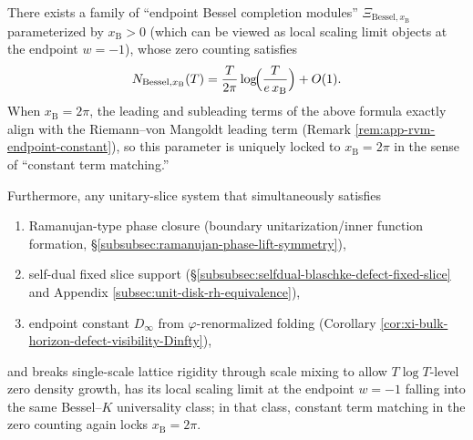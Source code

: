 \begin{conjecture}[Universality conjecture for the endpoint Bessel completion: locking \texorpdfstring{$x_{\mathrm{B}}=2\pi$}{xB=2pi} from the zero-counting constant term]\label{conj:discussion-endpoint-bessel-universality}
There exists a family of ``endpoint Bessel completion modules'' \(\Xi_{\mathrm{Bessel},x_{\mathrm{B}}}\) parameterized by \(x_{\mathrm{B}}>0\) (which can be viewed as local scaling limit objects at the endpoint \(w=-1\)), whose zero counting satisfies
\[
N_{\mathrm{Bessel},x_{\mathrm{B}}}(T)
=\frac{T}{2\pi}\log\!\Bigl(\frac{T}{e\,x_{\mathrm{B}}}\Bigr)+O(1).
\]
When \(x_{\mathrm{B}}=2\pi\), the leading and subleading terms of the above formula exactly align with the Riemann--von Mangoldt leading term (Remark \ref{rem:app-rvm-endpoint-constant}), so this parameter is uniquely locked to \(x_{\mathrm{B}}=2\pi\) in the sense of ``constant term matching.''
\par
Furthermore, any unitary-slice system that simultaneously satisfies
\begin{enumerate}
  \item[(i)] Ramanujan-type phase closure (boundary unitarization/inner function formation, \S\ref{subsubsec:ramanujan-phase-lift-symmetry}),
  \item[(ii)] self-dual fixed slice support (\S\ref{subsubsec:selfdual-blaschke-defect-fixed-slice} and Appendix \ref{subsec:unit-disk-rh-equivalence}),
  \item[(iii)] endpoint constant \(D_\infty\) from \(\varphi\)-renormalized folding (Corollary \ref{cor:xi-bulk-horizon-defect-visibility-Dinfty}),
\end{enumerate}
and breaks single-scale lattice rigidity through scale mixing to allow \(T\log T\)-level zero density growth,
has its local scaling limit at the endpoint \(w=-1\) falling into the same Bessel--\(K\) universality class; in that class, constant term matching in the zero counting again locks \(x_{\mathrm{B}}=2\pi\).
\end{conjecture}







